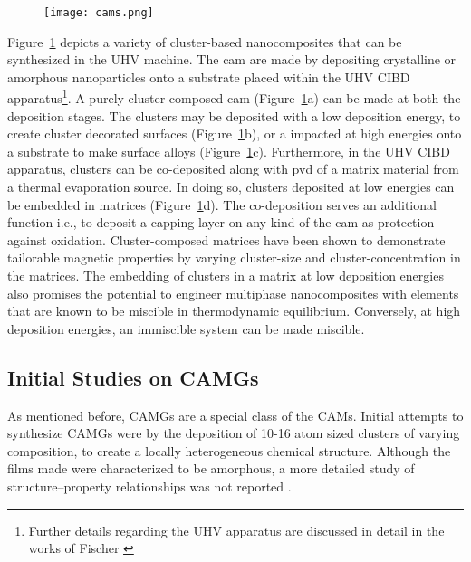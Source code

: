 \begin{figure}[!ht] \centering
	\texttt{[image: cams.png]}
	\label{f:camg-sch}
\end{figure}

Figure~\ref{f:camg-sch} depicts a variety of cluster-based nanocomposites that can be synthesized in the UHV machine. The \gls{cam} are made by depositing crystalline or amorphous nanoparticles onto a substrate placed within the UHV CIBD apparatus\footnote{Further details regarding the UHV apparatus are discussed in detail in the works of Fischer \cite{Fischer2015,Fischer2015a}}. A purely cluster-composed \gls{cam} (Figure~\ref{f:camg-sch}a) can be made at both the deposition stages. The clusters may be deposited with a low deposition energy, to create cluster decorated surfaces (Figure~\ref{f:camg-sch}b), or a impacted at high energies onto a substrate to make surface alloys (Figure~\ref{f:camg-sch}c). Furthermore, in the UHV CIBD apparatus, clusters can be co-deposited along with \gls{pvd} of a matrix material from a thermal evaporation source. In doing so, clusters deposited at low energies can be embedded in matrices (Figure~\ref{f:camg-sch}d). The co-deposition serves an additional function i.e., to deposit a capping layer on any kind of the \gls{cam} as protection against oxidation. Cluster-composed matrices \cite{Fischer2015a,Benel2018,Gack2020} have been shown to demonstrate tailorable magnetic properties by varying cluster-size and cluster-concentration in the matrices. The embedding of clusters in a matrix at low deposition energies also promises the potential to engineer multiphase nanocomposites with elements that are known to be miscible in thermodynamic equilibrium. Conversely, at high deposition energies, an immiscible system can be made miscible. \par

\clearpage

\subsection{Initial Studies on CAMGs}
As mentioned before, CAMGs are a special class of the CAMs. Initial attempts to synthesize CAMGs were by the deposition of 10-16 atom sized clusters of varying composition, to create a locally heterogeneous chemical structure. Although the films made were characterized to be amorphous, a more detailed study of structure–property relationships was not reported \cite{Kartouzian2013,Kartouzian2014}. \par

